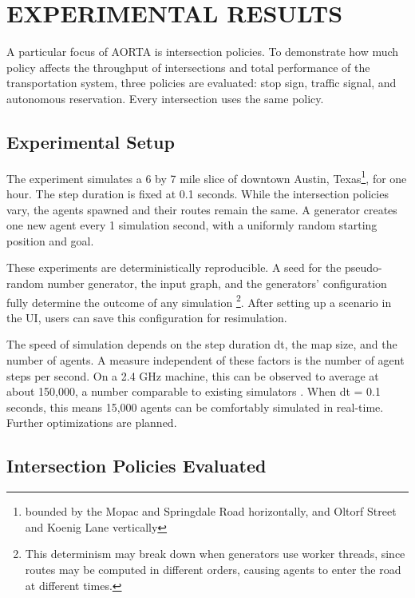 \documentclass[letterpaper, 10 pt, conference]{ieeeconf}  %
\begin{document}

\section{EXPERIMENTAL RESULTS}
\label{sec:results}

A particular focus of AORTA is intersection policies. To demonstrate how much
policy affects the throughput of intersections and total performance of the
transportation system, three policies are evaluated: stop sign, traffic signal,
and autonomous reservation. Every intersection uses the same policy.

\subsection{Experimental Setup}

The experiment simulates a 6 by 7 mile slice of downtown Austin,
Texas\footnote{bounded by the Mopac and Springdale Road horizontally, and Oltorf
Street and Koenig Lane vertically}, for one hour. The step duration is fixed at
0.1 seconds. While the intersection policies vary, the agents spawned and their
routes remain the same. A generator creates one new agent every 1 simulation
second, with a uniformly random starting position and goal.

These experiments are deterministically reproducible. A seed for the
pseudo-random number generator, the input graph, and the generators'
configuration fully determine the outcome of any simulation \footnote{This
  determinism may break down when generators use worker threads, since routes
  may be computed in different orders, causing agents to enter the road at
different times.}. After setting up a scenario in the UI, users can save this
configuration for resimulation.

The speed of simulation depends on the step duration dt, the map size, and the
number of agents. A measure independent of these factors is the number of agent
steps per second. On a 2.4 GHz machine, this can be observed to average at about
150,000, a number comparable to existing simulators \cite{SUMOthesis}. When dt
= 0.1 seconds, this means 15,000 agents can be comfortably simulated in
real-time. Further optimizations are planned.

\subsection{Intersection Policies Evaluated}
\end{document}
